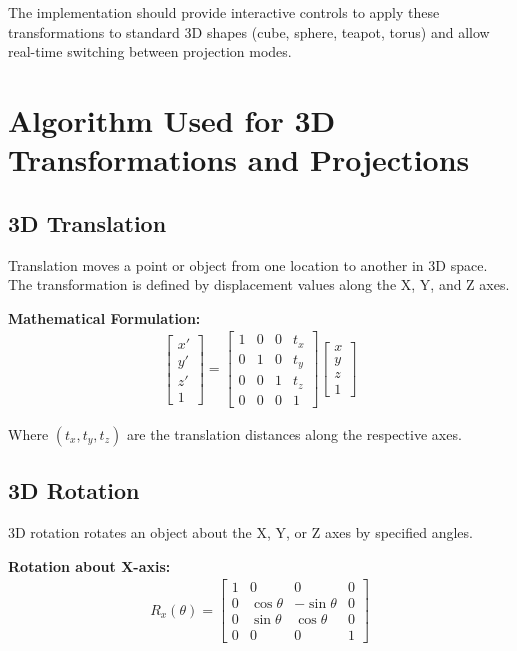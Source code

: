 \documentclass[12pt,a4paper]{article}
\begin{document}
The implementation should provide interactive controls to apply these transformations to standard 3D shapes (cube, sphere, teapot, torus) and allow real-time switching between projection modes.

\section{Algorithm Used for 3D Transformations and Projections}

\subsection{3D Translation}
Translation moves a point or object from one location to another in 3D space. The transformation is defined by displacement values along the X, Y, and Z axes.

\textbf{Mathematical Formulation:}
\begin{align}
\begin{bmatrix}
x' \\
y' \\
z' \\
1
\end{bmatrix}
=
\begin{bmatrix}
1 & 0 & 0 & t_x \\
0 & 1 & 0 & t_y \\
0 & 0 & 1 & t_z \\
0 & 0 & 0 & 1
\end{bmatrix}
\begin{bmatrix}
x \\
y \\
z \\
1
\end{bmatrix}
\end{align}

Where $(t_x, t_y, t_z)$ are the translation distances along the respective axes.

\subsection{3D Rotation}
3D rotation rotates an object about the X, Y, or Z axes by specified angles.

\textbf{Rotation about X-axis:}
\begin{align}
R_x(\theta) = \begin{bmatrix}
1 & 0 & 0 & 0 \\
0 & \cos\theta & -\sin\theta & 0 \\
0 & \sin\theta & \cos\theta & 0 \\
0 & 0 & 0 & 1
\end{bmatrix}
\end{align}
\end{document}
